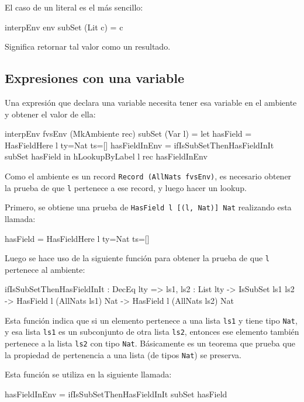 El caso de un literal es el más sencillo:

\begin{code}
interpEnv env subSet (Lit c) = c
\end{code}

Significa retornar tal valor como un resultado.

\subsection{Expresiones con una variable}

Una expresión que declara una variable necesita tener esa variable en el ambiente y obtener el valor de ella:

\begin{code}
interpEnv {fvsEnv} (MkAmbiente rec) subSet (Var l) =
  let hasField = HasFieldHere {l} {ty=Nat} {ts=[]}
    hasFieldInEnv = ifIsSubSetThenHasFieldInIt subSet hasField
  in hLookupByLabel l rec hasFieldInEnv
\end{code}

Como el ambiente es un record \texttt{Record (AllNats fvsEnv)}, es necesario obtener la prueba de que \texttt{l} pertenece a ese record, y luego hacer un lookup.

Primero, se obtiene una prueba de \texttt{HasField l [(l, Nat)] Nat} realizando esta llamada:

\begin{code}
hasField = HasFieldHere {l} {ty=Nat} {ts=[]}
\end{code}

Luego se hace uso de la siguiente función para obtener la prueba de que \texttt{l} pertenece al ambiente:

\begin{code}
ifIsSubSetThenHasFieldInIt : DecEq lty => {ls1, ls2 : List lty} ->
  IsSubSet ls1 ls2 -> HasField l (AllNats ls1) Nat ->
  HasField l (AllNats ls2) Nat
\end{code}

Esta función indica que si un elemento pertenece a una lista \texttt{ls1} y tiene tipo \texttt{Nat}, y esa lista \texttt{ls1} es un subconjunto de otra lista \texttt{ls2}, entonces ese elemento también pertenece a la lista \texttt{ls2} con tipo \texttt{Nat}. Básicamente es un teorema que prueba que la propiedad de pertenencia a una lista (de tipos \texttt{Nat}) se preserva.

Esta función se utiliza en la siguiente llamada:

\begin{code}
hasFieldInEnv = ifIsSubSetThenHasFieldInIt subSet hasField
\end{code}

